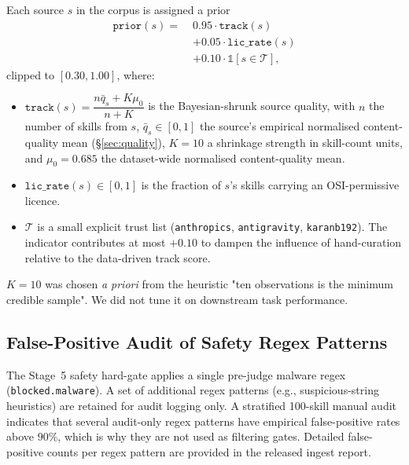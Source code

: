 Each source $s$ in the corpus is assigned a prior
\begin{align*}
  \mathtt{prior}(s) =\;& 0.95 \cdot \mathtt{track}(s) \\
                       & + 0.05 \cdot \mathtt{lic\_rate}(s) \\
                       & + 0.10 \cdot \mathbb{1}[s \in \mathcal{T}],
\end{align*}
clipped to $[0.30, 1.00]$, where:
\begin{itemize}
\item $\mathtt{track}(s) = \dfrac{n\bar{q}_s + K\mu_0}{n + K}$ is
      the Bayesian-shrunk source quality, with $n$ the number of
      skills from $s$, $\bar{q}_s \in [0,1]$ the source's empirical
      normalised content-quality mean (\S\ref{sec:quality}), $K=10$
      a shrinkage strength in skill-count units, and $\mu_0=0.685$
      the dataset-wide normalised content-quality mean.
\item $\mathtt{lic\_rate}(s) \in [0,1]$ is the fraction of $s$'s
      skills carrying an OSI-permissive licence.
\item $\mathcal{T}$ is a small explicit trust list
      (\texttt{anthropics}, \texttt{antigravity},
      \texttt{karanb192}).  The indicator contributes at most
      $+0.10$ to dampen the influence of hand-curation relative to
      the data-driven track score.
\end{itemize}
$K=10$ was chosen \emph{a priori} from the heuristic "ten observations
is the minimum credible sample".  We did not tune it on downstream
task performance.

\subsection{False-Positive Audit of Safety Regex Patterns}
\label{app:fp-audit}

The Stage~5 safety hard-gate applies a single pre-judge malware
regex (\texttt{blocked.malware}).  A set of additional regex patterns
(e.g., suspicious-string heuristics) are retained for audit logging
only.  A stratified 100-skill manual audit indicates that several
audit-only regex patterns have empirical false-positive rates above
$90\%$, which is why they are not used as filtering gates.  Detailed
false-positive counts per regex pattern are provided in the released
ingest report.

